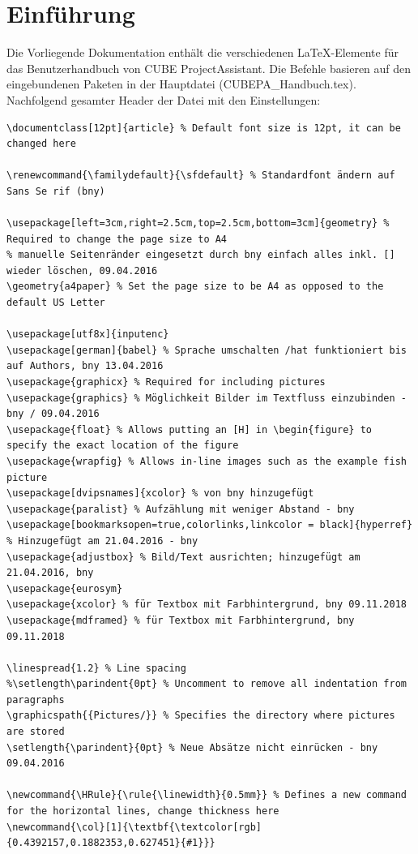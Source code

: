 
\section{Einführung}

Die Vorliegende Dokumentation enthält die verschiedenen \LaTeX -Elemente für das Benutzerhandbuch von CUBE ProjectAssistant.
Die Befehle basieren auf den eingebundenen Paketen in der Hauptdatei (CUBEPA\_Handbuch.tex). Nachfolgend gesamter Header der Datei mit den Einstellungen:


\begin{scriptsize}
\begin{verbatim}
\documentclass[12pt]{article} % Default font size is 12pt, it can be changed here

\renewcommand{\familydefault}{\sfdefault} % Standardfont ändern auf Sans Se rif (bny)

\usepackage[left=3cm,right=2.5cm,top=2.5cm,bottom=3cm]{geometry} % Required to change the page size to A4
% manuelle Seitenränder eingesetzt durch bny einfach alles inkl. [] wieder löschen, 09.04.2016
\geometry{a4paper} % Set the page size to be A4 as opposed to the default US Letter

\usepackage[utf8x]{inputenc}
\usepackage[german]{babel} % Sprache umschalten /hat funktioniert bis auf Authors, bny 13.04.2016
\usepackage{graphicx} % Required for including pictures
\usepackage{graphics} % Möglichkeit Bilder im Textfluss einzubinden - bny / 09.04.2016
\usepackage{float} % Allows putting an [H] in \begin{figure} to specify the exact location of the figure
\usepackage{wrapfig} % Allows in-line images such as the example fish picture
\usepackage[dvipsnames]{xcolor} % von bny hinzugefügt
\usepackage{paralist} % Aufzählung mit weniger Abstand - bny
\usepackage[bookmarksopen=true,colorlinks,linkcolor = black]{hyperref} % Hinzugefügt am 21.04.2016 - bny
\usepackage{adjustbox} % Bild/Text ausrichten; hinzugefügt am 21.04.2016, bny
\usepackage{eurosym}
\usepackage{xcolor} % für Textbox mit Farbhintergrund, bny 09.11.2018
\usepackage{mdframed} % für Textbox mit Farbhintergrund, bny 09.11.2018

\linespread{1.2} % Line spacing
%\setlength\parindent{0pt} % Uncomment to remove all indentation from paragraphs
\graphicspath{{Pictures/}} % Specifies the directory where pictures are stored
\setlength{\parindent}{0pt} % Neue Absätze nicht einrücken - bny 09.04.2016

\newcommand{\HRule}{\rule{\linewidth}{0.5mm}} % Defines a new command for the horizontal lines, change thickness here
\newcommand{\col}[1]{\textbf{\textcolor[rgb]{0.4392157,0.1882353,0.627451}{#1}}}

\end{verbatim}
\end{scriptsize}

